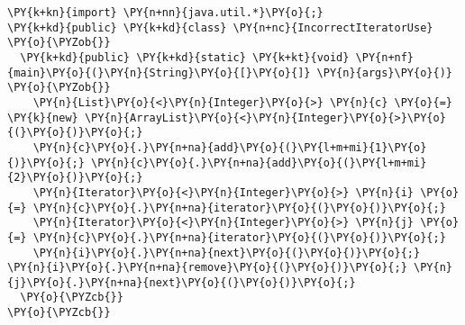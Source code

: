 \begin{Verbatim}[commandchars=\\\{\}]
\PY{k+kn}{import} \PY{n+nn}{java.util.*}\PY{o}{;}
\PY{k+kd}{public} \PY{k+kd}{class} \PY{n+nc}{IncorrectIteratorUse} \PY{o}{\PYZob{}}
  \PY{k+kd}{public} \PY{k+kd}{static} \PY{k+kt}{void} \PY{n+nf}{main}\PY{o}{(}\PY{n}{String}\PY{o}{[}\PY{o}{]} \PY{n}{args}\PY{o}{)} \PY{o}{\PYZob{}}
    \PY{n}{List}\PY{o}{<}\PY{n}{Integer}\PY{o}{>} \PY{n}{c} \PY{o}{=} \PY{k}{new} \PY{n}{ArrayList}\PY{o}{<}\PY{n}{Integer}\PY{o}{>}\PY{o}{(}\PY{o}{)}\PY{o}{;}
    \PY{n}{c}\PY{o}{.}\PY{n+na}{add}\PY{o}{(}\PY{l+m+mi}{1}\PY{o}{)}\PY{o}{;} \PY{n}{c}\PY{o}{.}\PY{n+na}{add}\PY{o}{(}\PY{l+m+mi}{2}\PY{o}{)}\PY{o}{;}
    \PY{n}{Iterator}\PY{o}{<}\PY{n}{Integer}\PY{o}{>} \PY{n}{i} \PY{o}{=} \PY{n}{c}\PY{o}{.}\PY{n+na}{iterator}\PY{o}{(}\PY{o}{)}\PY{o}{;}
    \PY{n}{Iterator}\PY{o}{<}\PY{n}{Integer}\PY{o}{>} \PY{n}{j} \PY{o}{=} \PY{n}{c}\PY{o}{.}\PY{n+na}{iterator}\PY{o}{(}\PY{o}{)}\PY{o}{;}
    \PY{n}{i}\PY{o}{.}\PY{n+na}{next}\PY{o}{(}\PY{o}{)}\PY{o}{;} \PY{n}{i}\PY{o}{.}\PY{n+na}{remove}\PY{o}{(}\PY{o}{)}\PY{o}{;} \PY{n}{j}\PY{o}{.}\PY{n+na}{next}\PY{o}{(}\PY{o}{)}\PY{o}{;}
  \PY{o}{\PYZcb{}}
\PY{o}{\PYZcb{}}
\end{Verbatim}
